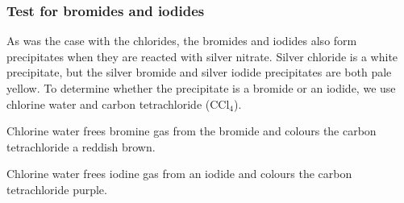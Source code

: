             \subsubsection*{Test for bromides and iodides}
            \nopagebreak
        \label{m38719*id341894}As was the case with the chlorides, the bromides and iodides also form precipitates when they are reacted with silver nitrate. Silver chloride is a white precipitate, but the silver bromide and silver iodide precipitates are both pale yellow. To determine whether the precipitate is a bromide or an iodide, we use chlorine water and carbon tetrachloride (${\mathrm{CCl}}_{4}$).\par 
        \label{m38719*id341914}Chlorine water frees bromine gas from the bromide and colours the carbon tetrachloride a reddish brown.\par 
        \label{m38719*id341920}Chlorine water frees iodine gas from an iodide and colours the carbon tetrachloride purple.\par 
\label{m38719*secfhsst!!!underscore!!!id1016}
